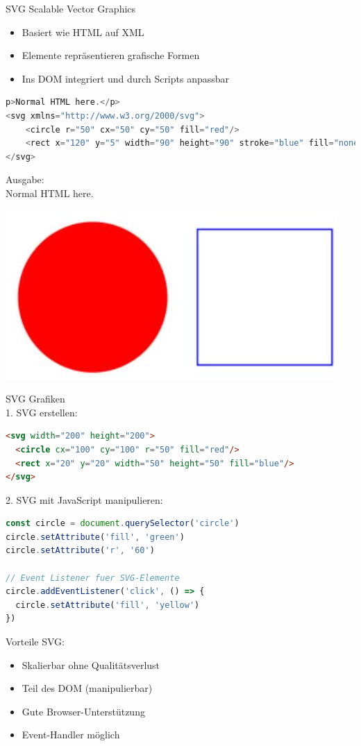 \begin{definition}{SVG}
Scalable Vector Graphics
\begin{itemize}
  \item Basiert wie HTML auf XML
  \item Elemente repräsentieren grafische Formen
  \item Ins DOM integriert und durch Scripts anpassbar
\end{itemize}
\begin{lstlisting}[language=JavaScript, style=basesmol]
p>Normal HTML here.</p>
<svg xmlns="http://www.w3.org/2000/svg">
    <circle r="50" cx="50" cy="50" fill="red"/>
    <rect x="120" y="5" width="90" height="90" stroke="blue" fill="none"/>
</svg>
\end{lstlisting}
Ausgabe:\\
Normal HTML here.
\begin{center}
\includegraphics[width=0.2\linewidth]{images/2024_12_29_858f09cde51177c71657g-27}
\end{center}
\end{definition}

\begin{KR}{SVG Grafiken}\\
1. SVG erstellen:
\begin{lstlisting}[language=HTML, style=basesmol]
<svg width="200" height="200">
  <circle cx="100" cy="100" r="50" fill="red"/>
  <rect x="20" y="20" width="50" height="50" fill="blue"/>
</svg>
\end{lstlisting}

2. SVG mit JavaScript manipulieren:
\begin{lstlisting}[language=JavaScript, style=basesmol]
const circle = document.querySelector('circle')
circle.setAttribute('fill', 'green')
circle.setAttribute('r', '60')

// Event Listener fuer SVG-Elemente
circle.addEventListener('click', () => {
  circle.setAttribute('fill', 'yellow')
})
\end{lstlisting}

Vorteile SVG:
\begin{itemize}
  \item Skalierbar ohne Qualitätsverlust
  \item Teil des DOM (manipulierbar)
  \item Gute Browser-Unterstützung
  \item Event-Handler möglich
\end{itemize}
\end{KR}




